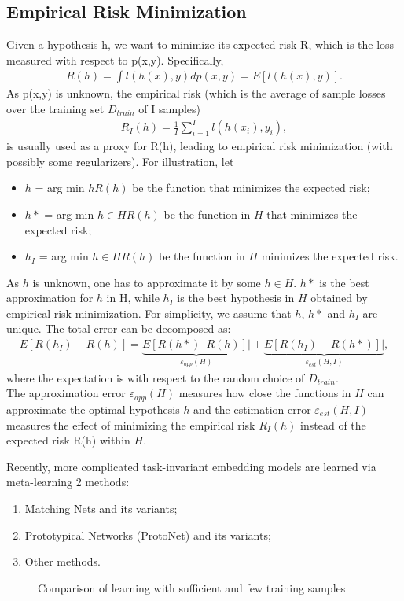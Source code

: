 \documentclass[12pt]{informs4}
\begin{document}
\subsection{Empirical Risk Minimization}
Given a hypothesis h, we want to minimize its expected risk R, which is the loss measured with respect to p(x,y). Specifically,
\begin{gather}
R(h)=\int l(h(x),y)dp(x,y)= E[l(h(x),y)]. \label{3}
\end{gather}
As p(x,y) is unknown, the empirical risk (which is the average of sample losses over the training set $D_{train}$ of I samples)
\begin{gather}
R_I(h)=\frac{1}{I}\sum^I_{i=1}l(h(x_i), y_i), \label{4}
\end{gather}
is usually used as a proxy for R(h), leading to empirical risk minimization (with possibly some regularizers). For illustration, let
\begin{itemize}
\item $h$ = arg min $h R(h)$ be the function that minimizes the expected risk;
\item $h*$ = arg min $h \in H R(h)$ be the function in $H$ that minimizes the expected risk;
\item $h_I$ = arg min $h \in H R(h)$ be the function in $H$ minimizes the expected risk.
\end{itemize}
As $h$ is unknown, one has to approximate it by some $h \in H$. $h*$ is the best approximation for $h$ in H, while $h_I$ is the best hypothesis in $H$ obtained by empirical risk minimization. For simplicity, we assume that $h$, $h*$ and $h_I$ are unique. The total error can be decomposed as:
\begin{gather}
E[R(h_I)-R(h)]=\underbrace{E[R(h*)–R(h)]|}_{\varepsilon_{app}(H)}+\underbrace{E[R(h_I)-R(h*)]|}_{\varepsilon_{est}(H, I)}, \label{5}
\end{gather}
where the expectation is with respect to the random choice of $D_{train}$.\\

The approximation error $\varepsilon_{app}(H)$ measures how close the functions in $H$ can approximate the optimal hypothesis $h$ and the estimation error $\varepsilon_{est}(H, I)$ measures the effect of minimizing the empirical risk $R_I(h)$ instead of the expected risk R(h) within $H$.

Recently, more complicated task-invariant embedding models are learned via meta-learning 2 methods:
\begin{enumerate}
\item Matching Nets and its variants;
\item Prototypical Networks (ProtoNet) and its variants;
\item Other methods.
\end{enumerate}
\begin{figure}[H]
\caption{Comparison of learning with sufficient and few training samples}
\label{f1}
\end{figure}
\end{document}
